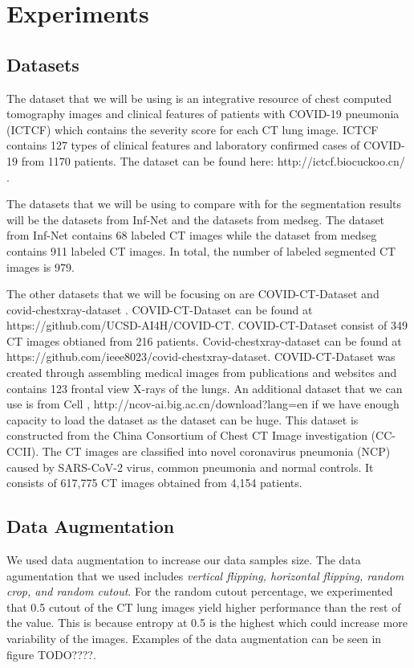 \section{Experiments}

\subsection{Datasets}
The dataset that we will be using is an integrative resource of chest computed tomography images and clinical features of patients with COVID-19 pneumonia (ICTCF) \cite{ref23} which contains the severity score for each CT lung image. ICTCF contains 127 types of clinical features and laboratory confirmed cases of COVID-19 from 1170 patients. The dataset can be found here: http://ictcf.biocuckoo.cn/ . 

The datasets that we will be using to compare with for the segmentation results will be the datasets from Inf-Net\cite{ref14} and the datasets from medseg\cite{ref26}. The dataset from Inf-Net\cite{ref14} contains 68 labeled CT images while the dataset from medseg contains 911 labeled CT images. In total, the number of labeled segmented CT images is 979.

The other datasets that we will be focusing on are COVID-CT-Dataset \cite{ref21} and covid-chestxray-dataset \cite{ref22}. COVID-CT-Dataset can be found at https://github.com/UCSD-AI4H/COVID-CT. COVID-CT-Dataset consist of 349 CT images obtianed from 216 patients. Covid-chestxray-dataset can be found at https://github.com/ieee8023/covid-chestxray-dataset. COVID-CT-Dataset  was created through assembling medical images from publications and websites and contains 123 frontal view X-rays of the lungs. An additional dataset that we can use is from Cell \cite{ref24}, http://ncov-ai.big.ac.cn/download?lang=en if we have enough capacity to load the dataset as the dataset can be huge. This dataset is constructed from the China Consortium of Chest CT Image investigation (CC-CCII). The CT images are classified into novel coronavirus pneumonia (NCP) caused by SARS-CoV-2 virus, common pneumonia and normal controls. It consists of 617,775 CT images obtained from 4,154 patients.

\subsection{Data Augmentation}
We used data augmentation to increase our data samples size. The data agumentation that we used includes \textit{vertical flipping, horizontal flipping, random crop, and random cutout}. For the random cutout percentage, we experimented that 0.5 cutout of the CT lung images yield higher performance than the rest of the value. This is because entropy at 0.5 is the highest which could increase more variability of the images. Examples of the data augmentation can be seen in figure TODO????.

